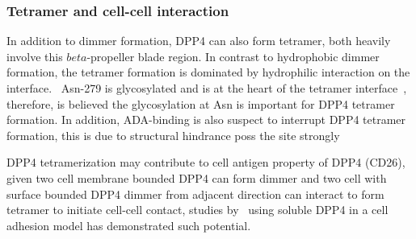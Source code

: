 \subsubsection{Tetramer and cell-cell interaction}

In addition to dimmer formation, DPP4 can also form tetramer, both heavily involve this $beta$-propeller blade region. In contrast to hydrophobic dimmer formation, the tetramer formation is dominated by hydrophilic interaction on the interface.~\cite{Engel_2003} Asn-279 is glycosylated and is at the heart of the tetramer interface~\cite{Engel_2003}, therefore, is believed the glycosylation at Asn is important for DPP4 tetramer formation. In addition, ADA-binding is also suspect to interrupt DPP4 tetramer formation, this is due to structural hindrance poss  the  site strongly  
\par 
DPP4 tetramerization may contribute to cell antigen property of DPP4 (CD26), given two cell membrane bounded DPP4 can form dimmer and two cell with surface bounded DPP4 dimmer from adjacent direction can interact to form tetramer to initiate cell-cell contact, studies by~\citet{Cheng1998,Abdel-Ghany1998} using soluble DPP4 in a cell adhesion model has demonstrated such potential. 